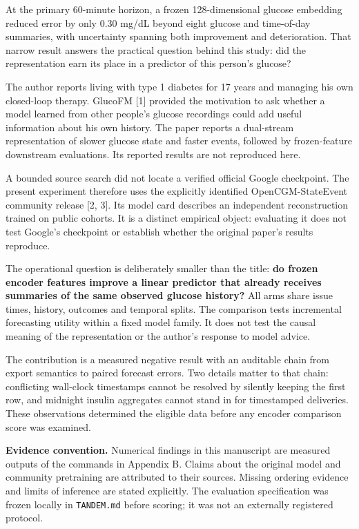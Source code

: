 \documentclass[11pt,letterpaper]{article}
\begin{document}
At the primary 60-minute horizon, a frozen 128-dimensional glucose
embedding reduced error by only 0.30 mg/dL beyond eight glucose and
time-of-day summaries, with uncertainty spanning both improvement and
deterioration. That narrow result answers the practical question behind
this study: did the representation earn its place in a predictor of this
person's glucose?

The author reports living with type 1 diabetes for 17 years and managing
his own closed-loop therapy. GlucoFM {[}1{]} provided the motivation to
ask whether a model learned from other people's glucose recordings could
add useful information about his own history. The paper reports a
dual-stream representation of slower glucose state and faster events,
followed by frozen-feature downstream evaluations. Its reported results
are not reproduced here.

A bounded source search did not locate a verified official Google
checkpoint. The present experiment therefore uses the explicitly
identified OpenCGM-StateEvent community release {[}2, 3{]}. Its model
card describes an independent reconstruction trained on public cohorts.
It is a distinct empirical object: evaluating it does not test Google's
checkpoint or establish whether the original paper's results reproduce.

The operational question is deliberately smaller than the title:
\textbf{do frozen encoder features improve a linear predictor that
already receives summaries of the same observed glucose history?} All
arms share issue times, history, outcomes and temporal splits. The
comparison tests incremental forecasting utility within a fixed model
family. It does not test the causal meaning of the representation or the
author's response to model advice.

The contribution is a measured negative result with an auditable chain
from export semantics to paired forecast errors. Two details matter to
that chain: conflicting wall-clock timestamps cannot be resolved by
silently keeping the first row, and midnight insulin aggregates cannot
stand in for timestamped deliveries. These observations determined the
eligible data before any encoder comparison score was examined.

\textbf{Evidence convention.} Numerical findings in this manuscript are
measured outputs of the commands in Appendix B. Claims about the
original model and community pretraining are attributed to their
sources. Missing ordering evidence and limits of inference are stated
explicitly. The evaluation specification was frozen locally in
\texttt{TANDEM.md} before scoring; it was not an externally registered
protocol.
\end{document}
